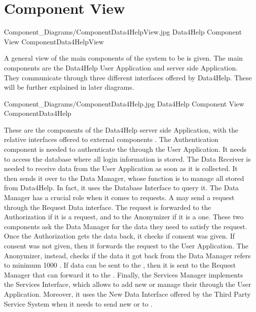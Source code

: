\documentclass[../../DD.tex]{subfiles}
\begin{document}
\section{Component View}

	\image {13cm} {Component_Diagrams/ComponentData4HelpView.jpg} {Data4Help Component View} {ComponentData4HelpView}

	A general view of the main components of the system to be is given. The main components are the Data4Help User Application and server side Application. They communicate through three different interfaces offered by Data4Help. These will be further explained in later diagrams. 

	\image {13cm} {Component_Diagrams/ComponentData4Help.jpg} {Data4Help Component View} {ComponentData4Help}

	These are the components of the Data4Help server side Application, with the relative interfaces offered to external components .
	The Authentication component is needed to authenticate the  through the User Application. It needs to access the database where all login information is stored. The Data Receiver is needed to receive data from the User Application as soon as it is collected. It then sends it over to the Data Manager, whose function is to manage all  stored from Data4Help. In fact, it uses the Database Interface to query it.
	The Data Manager has a crucial role when it comes to  requests. A  may send a request through the Request Data interface. The request is forwarded to the Authorization if it is a  request, and to the Anonymizer if it is a  one. These two components ask the Data Manager for the data they need to satisfy the request. Once the Authorization gets the data back, it checks if  consent was given. If consent was not given, then it forwards the request to the User Application. The Anonymizer, instead, checks if the data it got back from the Data Manager refers to minimum 1000 . If data can be sent to the , then it is sent to the Request Manager that can forward it to the  .
	Finally, the Services Manager implements the Services Interface, which allows  to add new or manage their  through the User Application. Moreover, it uses the New Data Interface offered by the Third Party Service System when it needs to send new  or  to .
\end{document}
